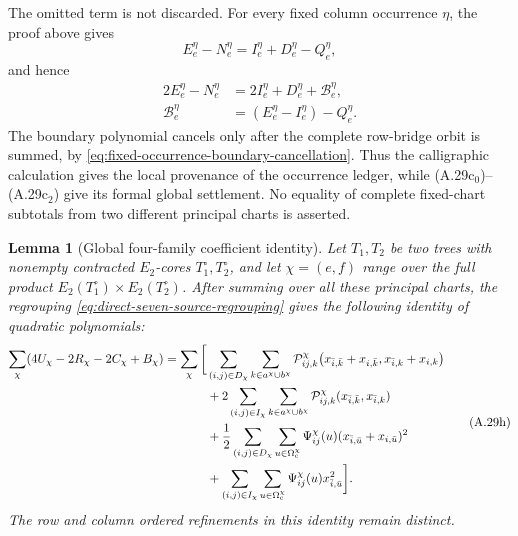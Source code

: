 \documentclass[11pt]{article}
\newtheorem{lemma}[theorem]{Lemma}
\begin{document}
The omitted term is not discarded.  For every fixed column occurrence
$\eta$, the proof above gives
\[
 E_e^\eta-N_e^\eta
 =I_e^\eta+D_e^\eta-Q_e^\eta,
\]
and hence
\[
\begin{aligned}
2E_e^\eta-N_e^\eta
&=2I_e^\eta+D_e^\eta+\mathcal B_e^\eta,\\
\mathcal B_e^\eta
&=(E_e^\eta-I_e^\eta)-Q_e^\eta.
\end{aligned}
\]
The boundary polynomial cancels only after the complete row-bridge orbit is
summed, by \eqref{eq:fixed-occurrence-boundary-cancellation}.  Thus the
calligraphic calculation gives the local provenance of the occurrence
ledger, while (A.29c$_0$)--(A.29c$_2$) give its formal global settlement.
No equality of complete fixed-chart subtotals from two different principal
charts is asserted.

\begin{lemma}[Global four-family coefficient identity]
\label{lem:master-coefficient-ledger}
Let $T_1,T_2$ be two trees with nonempty contracted $E_2$-cores
$T_1^\circ,T_2^\circ$, and let
$\chi=(e,f)$ range over the full product
$E_2(T_1^\circ)\times E_2(T_2^\circ)$.  After summing over all these principal
charts, the regrouping
\eqref{eq:direct-seven-source-regrouping} gives the following identity of
quadratic polynomials:
\begin{equation}\label{eq:unscaled-four-class-ledger}
\begin{aligned}
\sum_\chi(4U_\chi-2R_\chi-2C_\chi+B_\chi)
=\sum_\chi\bigg[&
\sum_{(i,j)\in D_\chi}\sum_{k\in a^\chi\cup b^\chi}
\mathcal P_{ij,k}^{\chi}\!\left(
 x_{\bar i,\bar k}+x_{i,\bar k},
 x_{\bar i,k}+x_{i,k}\right)\\
&+2\sum_{(i,j)\in I_\chi}\sum_{k\in a^\chi\cup b^\chi}
\mathcal P_{ij,k}^{\chi}(x_{\bar i,\bar k},x_{\bar i,k})\\
&+\frac12\sum_{(i,j)\in D_\chi}
 \sum_{u\in\Omega_{\rm c}^\chi}
 \Psi_{ij}^\chi(u)(x_{\bar i,\bar u}+x_{i,\bar u})^2\\
&+\sum_{(i,j)\in I_\chi}
 \sum_{u\in\Omega_{\rm c}^\chi}
 \Psi_{ij}^\chi(u)x_{\bar i,\bar u}^2\bigg].
\end{aligned}
\tag{A.29h}
\end{equation}
The row and column ordered refinements in this identity remain distinct.
\end{lemma}
\end{document}
